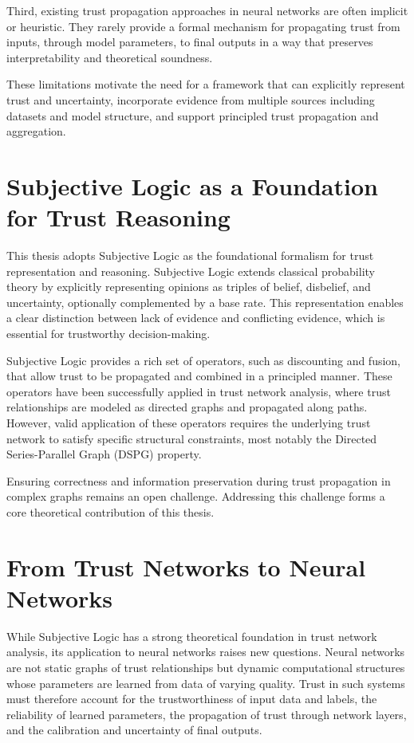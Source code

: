 Third, existing trust propagation approaches in neural networks are often implicit or heuristic. They rarely provide a formal mechanism for propagating trust from inputs, through model parameters, to final outputs in a way that preserves interpretability and theoretical soundness.

These limitations motivate the need for a framework that can explicitly represent trust and uncertainty, incorporate evidence from multiple sources including datasets and model structure, and support principled trust propagation and aggregation.

\section{Subjective Logic as a Foundation for Trust Reasoning}
\label{sec:subjective_logic}

This thesis adopts Subjective Logic as the foundational formalism for trust representation and reasoning. Subjective Logic extends classical probability theory by explicitly representing opinions as triples of belief, disbelief, and uncertainty, optionally complemented by a base rate. This representation enables a clear distinction between lack of evidence and conflicting evidence, which is essential for trustworthy decision-making.

Subjective Logic provides a rich set of operators, such as discounting and fusion, that allow trust to be propagated and combined in a principled manner. These operators have been successfully applied in trust network analysis, where trust relationships are modeled as directed graphs and propagated along paths. However, valid application of these operators requires the underlying trust network to satisfy specific structural constraints, most notably the Directed Series-Parallel Graph (DSPG) property.

Ensuring correctness and information preservation during trust propagation in complex graphs remains an open challenge. Addressing this challenge forms a core theoretical contribution of this thesis.

\section{From Trust Networks to Neural Networks}
\label{sec:trust_to_nn}

While Subjective Logic has a strong theoretical foundation in trust network analysis, its application to neural networks raises new questions. Neural networks are not static graphs of trust relationships but dynamic computational structures whose parameters are learned from data of varying quality. Trust in such systems must therefore account for the trustworthiness of input data and labels, the reliability of learned parameters, the propagation of trust through network layers, and the calibration and uncertainty of final outputs.


